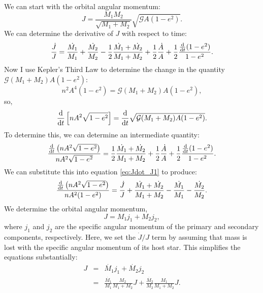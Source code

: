 \documentclass{emulateapj}
\begin{document}
We can start with the orbital angular momentum:
\begin{equation}
J =  \frac{M_1 M_2}{\sqrt{M_1 + M_2}} \sqrt{\mathcal{G} A (1-e^2)}. \label{eq:J_def}
\end{equation}
We can determine the derivative of $J$ with respect to time:
\begin{equation}
\frac{\dot{J}}{J} = \frac{\dot{M_1}}{M_1} + \frac{\dot{M_2}}{M_2} - \frac{1}{2}\frac{\dot{M_1} + \dot{M_2}}{M_1 + M_2} + \frac{1}{2} \frac{\dot{A}}{A} + \frac{1}{2}\frac{\frac{\rm d}{{\rm d}t} (1-e^2)}{1-e^2}. \label{eq:Jdot_J1}
\end{equation}
Now I use Kepler's Third Law to determine the change in the quantity $\mathcal{G}(M_1 + M_2)A (1-e^2)$:
\begin{equation}
n^2 A^4 (1-e^2) = \mathcal{G} (M_1+M_2) A (1-e^2), 
\end{equation}
so,
\begin{equation}
\frac{\rm d}{{\rm d}t} \left[ n A^2 \sqrt{1-e^2} \right] = \frac{\rm d}{{\rm d}t} \sqrt{ \mathcal{G} (M_1+M_2) A (1-e^2)}.
\end{equation}
To determine this, we can determine an intermediate quantity:
\begin{equation}
\frac{\frac{\rm d}{{\rm d}t} \left( n A^2 \sqrt{1-e^2} \right)}{n A^2 \sqrt{1-e^2}} =  \frac{1}{2} \frac{\dot{M_1} + \dot{M_2}}{M_1 + M_2} + \frac{1}{2} \frac{\dot{A}}{A} + \frac{1}{2}\frac{\frac{\rm d}{{\rm d}t} (1-e^2)}{1-e^2}.
\end{equation}
We can substitute this into equation \ref{eq:Jdot_J1} to produce:
\begin{equation}
\frac{\frac{\rm d}{{\rm d}t} \left( n A^2 \sqrt{1-e^2} \right)}{n A^2 (1-e^2)} = \frac{\dot{J}}{J} + \frac{\dot{M_1} + \dot{M_2}}{M_1 + M_2} - \frac{\dot{M_1}}{M_1} - \frac{\dot{M_2}}{M_2}. \label{eq:dt_d}
\end{equation}
We determine the orbital angular momentum,
\begin{equation}
J = M_1 j_1 + M_2 j_2,
\end{equation}
where $j_1$ and $j_2$ are the specific angular momentum of the primary and secondary components, respectively. Here, we set the $\dot{J}/J$ term by assuming that mass is lost with the specific angular momentum of its host star. This simplifies the equations substantially:
\begin{eqnarray}
J &=& \dot{M_1} j_1 + \dot{M_2} j_2 \\
 &=& \frac{\dot{M_1}}{M_1} \frac{M_2}{M_1 + M_2} J + \frac{\dot{M_2}}{M_2} \frac{M_1}{M_1 + M_2} J. 
\end{eqnarray}
\end{document}
